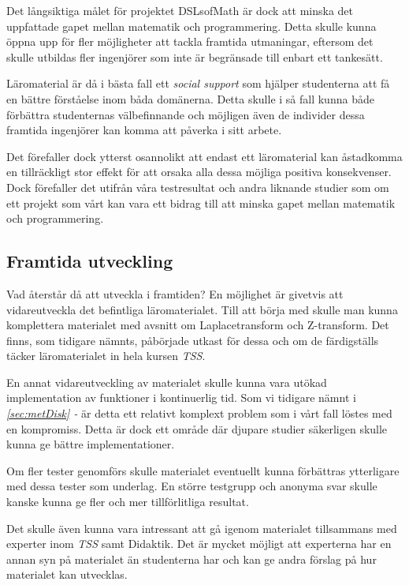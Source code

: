 \documentclass[12pt,a4paper,twoside,openright]{article}
\begin{document}
Det långsiktiga målet för projektet DSLsofMath är dock att minska det
uppfattade gapet mellan matematik och programmering. %
Detta skulle kunna öppna upp för fler möjligheter att
tackla framtida utmaningar, eftersom det skulle utbildas fler
ingenjörer som inte är begränsade till enbart ett tankesätt.

Läromaterial är då i bästa fall ett \emph{social support} som hjälper
studenterna att få en bättre förståelse inom båda domänerna. Detta
skulle i så fall kunna både förbättra studenternas välbefinnande och
möjligen även de individer dessa framtida ingenjörer kan komma att
påverka i sitt arbete.

Det förefaller dock ytterst osannolikt att endast ett läromaterial
kan åstadkomma en tillräckligt stor effekt för att orsaka alla
dessa möjliga positiva konsekvenser. Dock förefaller det utifrån
våra testresultat och andra liknande studier som om ett
projekt som vårt kan vara ett bidrag till att minska
gapet mellan matematik och programmering.

\subsection{Framtida utveckling}
Vad återstår då att utveckla i framtiden? En möjlighet är givetvis att
vidareutveckla det befintliga läromaterialet. Till att börja med
skulle man kunna komplettera materialet med avsnitt om
Laplacetransform och Z-transform. Det finns, som tidigare nämnts,
påbörjade utkast för dessa och om de färdigställs täcker
läromaterialet in hela kursen \textit{TSS}.

En annat vidareutveckling av materialet skulle kunna vara utökad
implementation av funktioner i kontinuerlig tid. Som vi tidigare nämnt
i \textit{\ref{sec:metDisk} - } är detta ett
relativt komplext problem som i vårt fall löstes med en
kompromiss. Detta är dock ett område där djupare studier säkerligen
skulle kunna ge bättre implementationer.

Om fler tester genomförs skulle materialet eventuellt kunna förbättras
ytterligare med dessa tester som underlag. En större testgrupp och
anonyma svar skulle kanske kunna ge fler och mer tillförlitliga
resultat.

Det skulle även kunna vara intressant att gå igenom materialet
tillsammans med experter inom \textit{TSS} samt Didaktik. Det är
mycket möjligt att experterna har en annan syn på materialet än
studenterna har och kan ge andra förslag på hur materialet kan
utvecklas.
\end{document}
